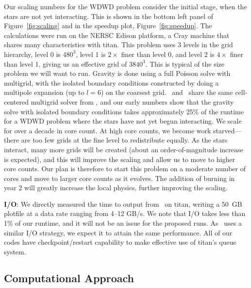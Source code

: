 Our scaling numbers for the WDWD problem consider the initial stage,
when the stars are not yet interacting.  This is shown in the bottom
left panel of Figure~\ref{fig:scaling} and in the speedup plot, Figure~\ref{fig:speedup}.
The calculations were run on the NERSC Edison
platform, a Cray machine that shares many characteristics with titan.
This problem uses 3 levels in the grid hierarchy, level 0 is $480^3$,
level 1 is $2\times$ finer than level 0, and level 2 is $4\times$
finer than level 1, giving us an effective grid of $3840^3$.  This is
typical of the size problem we will want to run.  Gravity is done
using a full Poisson solve with multigrid, with the isolated boundary
conditions constructed by doing a multipole expansion (up to $l=6$) on
the coarsest grid.  \castro\ and \maestro\ share the same
cell-centered multigrid solver from \boxlib, and our early numbers
show that the gravity solve with isolated boundary conditions takes
approximately 25\% of the runtime for a WDWD problem where the stars
have not yet begun interacting.  We scale for over a decade in core count.  At high core counts, we become work
starved---there are too few grids at the fine level to redistribute equally.  As the stars interact, many more grids will be created
(about an order-of-magnitude increase is expected), and this will
improve the scaling and allow us to move to higher core counts.  Our
plan is therefore to start this problem on a moderate number of cores
and move to larger core counts as it evolves.  The addition of burning
in year 2 will greatly increase the local physics, further improving
the scaling.



{\bf I/O}: 
%
We directly measured the time to output from
\maestro\ on titan, writing a 50~GB plotfile at a data rate
ranging from 4--12 GB/s.  We note that I/O takes less than 1\% of our
runtime, and it will not be an issue for the proposed runs.
As \castro\ uses a similar I/O strategy, we expect it to attain the
same performance.  All of our codes have checkpoint/restart capability 
to make effective use of titan's queue system.


\subsection{Computational Approach}


